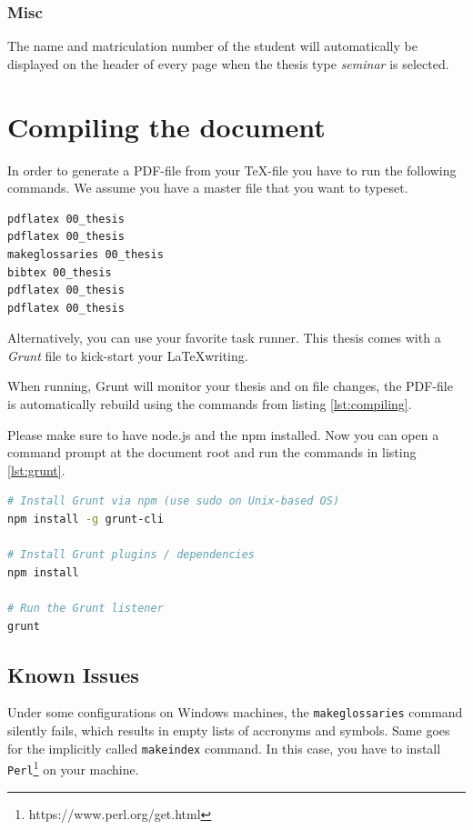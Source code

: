 \subsection{Misc}
The name and matriculation number of the student will automatically be displayed on the header of every page when the thesis type \textit{seminar} is selected.

\chapter{Compiling the document}
In order to generate a PDF-file from your \TeX-file you have to run the following commands. We assume you have a master file  that you want to typeset.

\begin{lstlisting}[float=htp, caption={Commands to compile this document}, label={lst:compiling}, language=bash, morekeywords={pdflatex, bibtex, makeglossaries}]
pdflatex 00_thesis
pdflatex 00_thesis
makeglossaries 00_thesis
bibtex 00_thesis
pdflatex 00_thesis
pdflatex 00_thesis
\end{lstlisting}

Alternatively, you can use your favorite task runner. This thesis comes with a \textit{Grunt} file to kick-start your \LaTeX writing.

When running, Grunt will monitor your thesis and on file changes, the PDF-file is automatically rebuild using the commands from listing \ref{lst:compiling}.
 
Please make sure to have node.js and the \gls{npm} installed. Now you can open a command prompt at the document root and run the commands in listing \ref{lst:grunt}. 

\begin{lstlisting}[float=htp, caption={Installing and running Grunt}, label={lst:grunt}, language=bash]
# Install Grunt via npm (use sudo on Unix-based OS)
npm install -g grunt-cli

# Install Grunt plugins / dependencies
npm install

# Run the Grunt listener 
grunt
\end{lstlisting}

\section{Known Issues}
Under some configurations on Windows machines, the \texttt{makeglossaries} command silently fails, which results in empty lists of accronyms and symbols. Same goes for the implicitly called \texttt{makeindex} command. In this case, you have to install \texttt{Perl}\footnote{https://www.perl.org/get.html} on your machine.